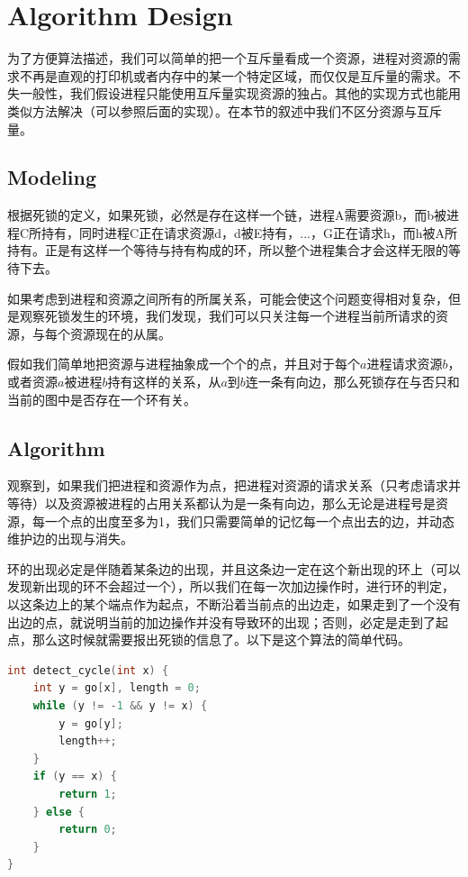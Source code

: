 \documentclass[titlepage]{article}
\begin{document}
\section{Algorithm Design}
\indent 为了方便算法描述，我们可以简单的把一个互斥量看成一个资源，进程对资源的需求不再是直观的打印机或者内存中的某一个特定区域，而仅仅是互斥量的需求。不失一般性，我们假设进程只能使用互斥量实现资源的独占。其他的实现方式也能用类似方法解决（可以参照后面的实现）。在本节的叙述中我们不区分资源与互斥量。
\subsection{Modeling}
\indent 根据死锁的定义，如果死锁，必然是存在这样一个链，进程A需要资源b，而b被进程C所持有，同时进程C正在请求资源d，d被E持有，...，G正在请求h，而h被A所持有。正是有这样一个等待与持有构成的环，所以整个进程集合才会这样无限的等待下去。

\indent 如果考虑到进程和资源之间所有的所属关系，可能会使这个问题变得相对复杂，但是观察死锁发生的环境，我们发现，我们可以只关注每一个进程当前所请求的资源，与每个资源现在的从属。

\indent 假如我们简单地把资源与进程抽象成一个个的点，并且对于每个$a$进程请求资源$b$，或者资源$a$被进程$b$持有这样的关系，从$a$到$b$连一条有向边，那么死锁存在与否只和当前的图中是否存在一个环有关。

\subsection{Algorithm}
\indent 观察到，如果我们把进程和资源作为点，把进程对资源的请求关系（只考虑请求并等待）以及资源被进程的占用关系都认为是一条有向边，那么无论是进程号是资源，每一个点的出度至多为1，我们只需要简单的记忆每一个点出去的边，并动态维护边的出现与消失。

\indent 环的出现必定是伴随着某条边的出现，并且这条边一定在这个新出现的环上（可以发现新出现的环不会超过一个），所以我们在每一次加边操作时，进行环的判定，以这条边上的某个端点作为起点，不断沿着当前点的出边走，如果走到了一个没有出边的点，就说明当前的加边操作并没有导致环的出现；否则，必定是走到了起点，那么这时候就需要报出死锁的信息了。以下是这个算法的简单代码。

\begin{lstlisting}[language=C]
int detect_cycle(int x) {
    int y = go[x], length = 0;
    while (y != -1 && y != x) {
        y = go[y];
        length++;
    }
    if (y == x) {
        return 1;
    } else {
        return 0;
    }
}
\end{lstlisting}
\end{document}
